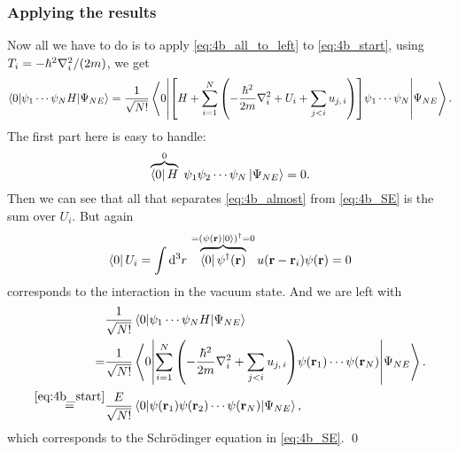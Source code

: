 \documentclass[11pt,letter, swedish, english
]{article}
\begin{document}
\subsubsection{Applying the results}
Now all we have to do is to apply \eqref{eq:4b_all_to_left} to
\eqref{eq:4b_start}, using $T_i=-\hbar^2\laplacian_i/(2m)$, we get
\begin{equation}\label{eq:4b_almost}
\mel**{0}{\psi_1\cdots\psi_{N}H}{\Psi_{NE}}=
\frac{1}{\sqrt{N!}}\mel**{0}{
\qty[H+\sum_{i=1}^N\qty(-\frac{\hbar^2}{2m}\laplacian_i
+U_i+\sum_{j<i}u_{j,\,i})
]\psi_1\cdots\psi_{N}}{\Psi_{NE}}.
\end{equation}
The first part here is easy to handle:
\begin{equation}
\overbrace{\bra{0} H}^{0}\;
\psi_1\psi_2\cdots\psi_{N}\ket{\Psi_{NE}}
=0.
\end{equation}
Then we can see that all that separates \eqref{eq:4b_almost} from
\eqref{eq:4b_SE} is the sum over $U_i$. But again
\begin{equation}
\bra{0} U_i=\int\rd^3r\,
\overbrace{\bra{0}\psi^\dagger(\vb{r})}^{=(\psi(\vb{r})\ket{0})^\dagger=0}
u(\vb{r}-\vb{r}_i)\psi(\vb{r})   = 0
\end{equation}
corresponds to the interaction in the vacuum state. 
And we are left with
\begin{equation}%
\begin{aligned}
&\frac{1}{\sqrt{N!}}\mel**{0}{\psi_1\cdots\psi_{N}H}{\Psi_{NE}}\\
=&\frac{1}{\sqrt{N!}}\mel**{0}{
\sum_{i=1}^N\qty(-\frac{\hbar^2}{2m}\laplacian_i
+\sum_{j<i}u_{j,\,i})
\psi(\vb{r}_1)\cdots\psi(\vb{r}_{N})}{\Psi_{NE}}.\\
\stackrel{\eqref{eq:4b_start}}{=}&
\frac{E}{\sqrt{N!}}
\mel{0}{\psi(\vb{r}_1)\psi(\vb{r}_2)\cdots\psi(\vb{r}_N)}{\Psi_{NE}},
\end{aligned}
\end{equation}
which corresponds to the Schrödinger equation in
\eqref{eq:4b_SE}.
\qed
\end{document}
